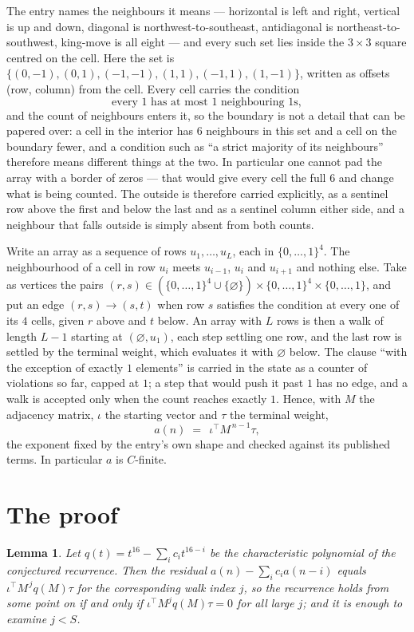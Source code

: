 \documentclass[11pt,a4paper]{article}
\theoremstyle{plain}
\newtheorem{lemma}[theorem]{Lemma}
\theoremstyle{definition}
\begin{document}
The entry names the neighbours it means --- horizontal is left and right, vertical is up and
down, diagonal is northwest-to-southeast, antidiagonal is northeast-to-southwest, king-move is
all eight --- and every such set lies inside the $3\times3$ square centred on the cell. Here
the set is $\{(0,-1), (0,1), (-1,-1), (1,1), (-1,1), (1,-1)\}$, written as offsets (row, column) from the cell. Every cell carries
the condition
\[
\text{every 1 has at most 1 neighbouring 1s},
\]
and the count of neighbours enters it, so the boundary is not a detail that can be papered
over: a cell in the interior has $6$ neighbours in this set and a cell on the boundary
fewer, and a condition such as ``a strict majority of its neighbours'' therefore means
different things at the two. In particular one cannot pad the array with a border of zeros ---
that would give every cell the full $6$ and change what is being counted. The outside is
therefore carried
explicitly, as a sentinel row above the first and below the last and as a sentinel column
either side, and a neighbour that falls outside is simply absent from both counts.

Write an array as a sequence of rows $u_1,\dots,u_L$, each in
$\{0,\dots,1\}^{4}$. The neighbourhood of a cell in row $u_i$ meets $u_{i-1}$,
$u_i$ and $u_{i+1}$ and nothing else. Take as vertices the pairs
$(r,s)\in(\{0,\dots,1\}^{4}\cup\{\varnothing\})\times\{0,\dots,1\}^{4} \times \{0,\dots,1\}$,
and put an edge $(r,s)\to(s,t)$ when row $s$ satisfies the condition at every one of its
$4$ cells, given $r$ above and $t$ below. An array with $L$ rows is then a walk of length
$L-1$ starting at $(\varnothing,u_1)$, each step settling one row, and the last row is
settled by the terminal weight, which evaluates it with $\varnothing$ below. The clause ``with the exception of exactly $1$ elements'' is carried in
the state as a counter of violations so far, capped at $1$; a step that would push it past
$1$ has no edge, and a walk is accepted only when the count reaches exactly $1$. Hence,
with $M$ the adjacency matrix, $\iota$ the starting vector and $\tau$ the terminal weight,
\[
a(n)\;=\;\,\iota^{\!\top}M^{\,n-1}\tau ,
\]
the exponent fixed by the entry's own shape and checked against its published terms. In
particular $a$ is $C$-finite.

\section{The proof}

\begin{lemma}\label{lem:crit}
Let $q(t)=t^{16}-\sum_i c_it^{16-i}$ be the characteristic polynomial of the
conjectured recurrence. Then the residual $a(n)-\sum_ic_ia(n-i)$ equals
$\iota^{\!\top}M^{\,j}q(M)\tau$ for the corresponding walk index $j$, so the
recurrence holds from some point on if and only if $\iota^{\!\top}M^{j}q(M)\tau=0$ for all
large $j$; and it is enough to examine $j<S$.
\end{lemma}
\end{document}
